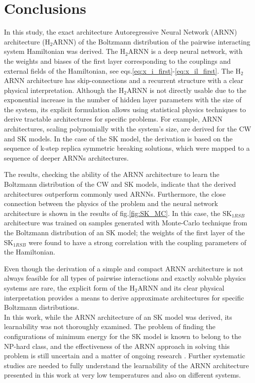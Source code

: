 \documentclass[aps,physrev,10pt,floatfix,reprint]{revtex4-2}
\begin{document}
\section{Conclusions}
In this study, the exact architecture  Autoregressive Neural Network (ARNN) architecture (H$_2$ARNN) of the Boltzmann distribution of the pairwise interacting system Hamiltonian was derived. The H$_2$ARNN is a deep neural network, with the weights and biases of the first layer corresponding to the couplings and external fields of the Hamiltonian, see eqs.\ref{eq:x_i_first}-\ref{eq:x_il_first}. The  H$_2$ARNN architecture has skip-connections and a recurrent structure with a clear physical interpretation. Although the H$_2$ARNN is not directly usable due to the exponential increase in the number of hidden layer parameters with the size of the system, its explicit formulation allows using statistical physics techniques to derive tractable architectures for specific problems. For example, ARNN architectures, scaling polynomially with the system's size, are derived for the CW and SK models. In the case of the SK model, the derivation is based on the sequence of k-step replica symmetric breaking solutions, which were mapped to a sequence of deeper ARNNs architectures.

The results, checking the ability of the ARNN architecture to learn the Boltzmann distribution of the CW and SK models, indicate that the derived architectures outperform commonly used ARNNs. Furthermore, the close connection between the physics of the problem and the neural network architecture is shown in the results of fig.\ref{fig:SK_MC}. In this case, the  SK$_{1RSB}$ architecture was trained on samples generated with Monte-Carlo technique from the Boltzmann distribution of an SK model; the weights of the first layer of the SK$_{1RSB}$ were found to have a strong correlation with the coupling parameters of the Hamiltonian.

Even though the derivation of a simple and compact ARNN architecture is not always feasible for all types of pairwise interactions and exactly solvable physics systems are rare, the explicit form of the H$_2$ARNN and its clear physical interpretation provides a means to derive approximate architectures for specific Boltzmann distributions. \\
In this work, while the ARNN architecture of an SK model was derived, its learnability was not thoroughly examined. The problem of finding the configurations of minimum energy for the SK model is known to belong to the NP-hard class, and the effectiveness of the ARNN approach in solving this problem is still uncertain and a matter of ongoing research \cite{https://doi.org/10.48550/arxiv.2210.11145, 10.1038/s42256-021-00401-3, condmat7020038}. Further systematic studies are needed to fully understand the learnability of the ARNN architecture presented in this work at very low temperatures and also on different systems.\\
\end{document}
